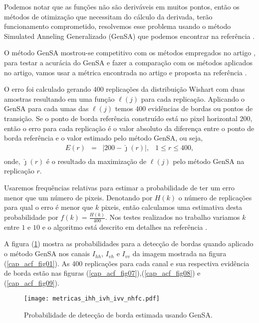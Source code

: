 	Podemos notar que as funções não são deriváveis em muitos pontos, então os métodos de otimização que necessitam do cálculo da derivada, terão funcionamento comprometido, resolvemos esse problema usando o método Simulated Anneling Generalizado (GenSA) que podemos encontrar na referência \citep{xgsh}.
	
	O método GenSA mostrou-se competitivo com os métodos empregados no artigo \citet{nhfc}, para testar a acurácia do GenSA e fazer a comparação com os métodos aplicados no artigo, vamos usar a métrica encontrada no artigo \citep{nhfc} e proposta na referência \citep{fbgm}.
        
	O erro foi calculado gerando $400$ replicações da distribuição Wishart com duas amostras resultando em uma função $\ell(j)$  para cada replicação. Aplicando o GenSA para cada umas das $\ell(j)$ temos $400$ evidências de bordas ou pontos de transição. Se o ponto de borda referência construído está no pixel horizontal $200$, então o erro para cada replicação é o valor absoluto da diferença entre o ponto de borda referência e o valor estimado pelo método GenSA, ou seja,  
\begin{equation}\label{eq:erro}
\begin{array}{llll}
	E(r) &=& |200 - \hat{\jmath}(r)|, & 1\leq r \leq 400,  \\
\end{array}
\end{equation}
onde, $\hat{\jmath}(r)$ é o resultado da maximização de $\ell(j)$ pelo método GenSA na replicação $r$.

Usaremos frequências relativas para estimar a probabilidade de ter um erro menor que um número de pixeis. Denotando por $H(k)$ o número de replicações para qual o erro é menor que $k$ pixeis, então calculamos uma estimativa desta probabilidade por $f(k)=\frac{H(k)}{400}$. Nos testes realizados no trabalho variamos $k$ entre $1$ e $10$ e o algoritmo está descrito em detalhes na referência \citep{fbgm}. 

	A figura (\ref{fig:Probbilidade_erro}) mostra as probabilidades para a detecção de bordas quando aplicado o método GenSA nos canais $I_{hh}$, $I_{vh}$ e $I_{vv}$ da imagem mostrada na figura (\ref{cap_acf_fig01}). As 400 replicações para cada canal e sua respectiva evidência de borda estão nas figuras (\ref{cap_acf_fig07}),(\ref{cap_acf_fig08}) e (\ref{cap_acf_fig09}).  
\begin{figure}[hbt]
\centering
	\texttt{[image: metricas\_ihh\_ivh\_ivv\_nhfc.pdf]}
	\caption{Probabilidade de detecção de borda estimada usando GenSA.}
\label{fig:Probbilidade_erro}
\end{figure}

